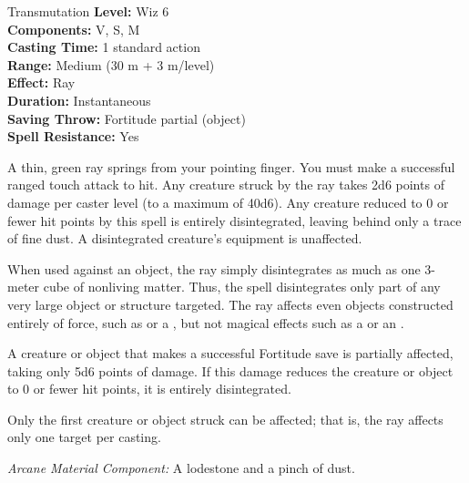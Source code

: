 {Transmutation}
{
	\textbf{Level:}
	Wiz 6\\
	\textbf{Components:}
	V, S, M\\
	\textbf{Casting Time:}
	1 standard action\\
	\textbf{Range:}
	Medium (30 m + 3 m/level)\\
	\textbf{Effect:}
	Ray\\
	\textbf{Duration:}
	Instantaneous\\
	\textbf{Saving Throw:}
	Fortitude partial (object)\\
	\textbf{Spell Resistance:}
	Yes\\
}
{
	A thin, green ray springs from your pointing finger. You must make a successful ranged touch attack to hit. Any creature struck by the ray takes 2d6 points of damage per caster level (to a maximum of 40d6). Any creature reduced to 0 or fewer hit points by this spell is entirely disintegrated, leaving behind only a trace of fine dust. A disintegrated creature's equipment is unaffected.

	When used against an object, the ray simply disintegrates as much as one 3-meter cube of nonliving matter. Thus, the spell disintegrates only part of any very large object or structure targeted. The ray affects even objects constructed entirely of force, such as  or a , but not magical effects such as a  or an .

	A creature or object that makes a successful Fortitude save is partially affected, taking only 5d6 points of damage. If this damage reduces the creature or object to 0 or fewer hit points, it is entirely disintegrated.

	Only the first creature or object struck can be affected; that is, the ray affects only one target per casting.

	\textit{Arcane Material Component:}
	A lodestone and a pinch of dust.

}
